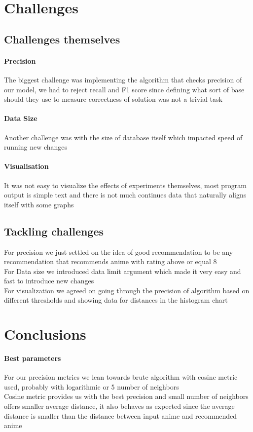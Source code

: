 \documentclass[12pt]{article}
\begin{document}
\section{Challenges}
\subsection{Challenges themselves}
\paragraph{Precision}
The biggest challenge was implementing the algorithm that checks precision of our model, we had to reject recall and F1 score since defining what sort of base should they use to measure correctness of solution was not a trivial task
\paragraph{Data Size}
Another challenge was with the size of database itself which impacted speed of running new changes 
\paragraph{Visualisation}
It was not easy to visualize the effects of experiments themselves, most program output is simple text and there is not much continues data that naturally aligns itself with some graphs
\subsection{Tackling challenges}
For precision we just settled on the idea of good recommendation to be any recommendation that recommends anime with rating above or equal 8 \\ 
For Data size we introduced data limit argument which made it very easy and fast to introduce new changes \\ 
For visualization we agreed on going through the precision of algorithm based on different thresholds and showing data for distances in the histogram chart

\section{Conclusions}
\paragraph{Best parameters}
For our precision metrics we lean towards brute algorithm with cosine metric used, probably with logarithmic or 5 number of neighbors \\ 
Cosine metric provides us with the best precision and small number of neighbors offers smaller average distance, it also behaves as expected since the average distance is smaller than the distance between input anime and recommended anime
\end{document}
